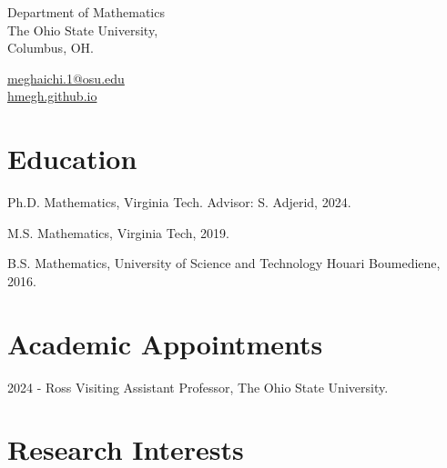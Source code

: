 \documentclass[11pt,letterpaper]{report}
\begin{document}
    \raggedright{}

    \namefont{\myname}

    \vspace{1em}
    \begin{minipage}[t]{0.700\textwidth}
        Department of Mathematics \\
       The Ohio State University,  \\
        Columbus, OH.  
    \end{minipage}\begin{minipage}[t]{0.295\textwidth}
        \flushright{}
        \href{mailto:meghaichi.1@osu.edu}{meghaichi.1@osu.edu} \\
        \href{https://hmegh.github.io}{hmegh.github.io}
    \end{minipage}

  


    \section*{Education}

    \begin{tablist}

        \item[Ph.D.] \tab{} Mathematics, Virginia Tech. Advisor: S. Adjerid, 2024.
        \item[M.S.]  \tab{} Mathematics, Virginia Tech, 2019.
        \item[B.S.]  \tab{} Mathematics, University of Science and Technology Houari Boumediene, 2016.

    \end{tablist}


    \section*{Academic Appointments}
    \begin{tablist}
        \item[2024 -] \tab{} Ross Visiting Assistant Professor, The Ohio State University.
    \end{tablist}


    \section*{Research Interests}
\end{document}
